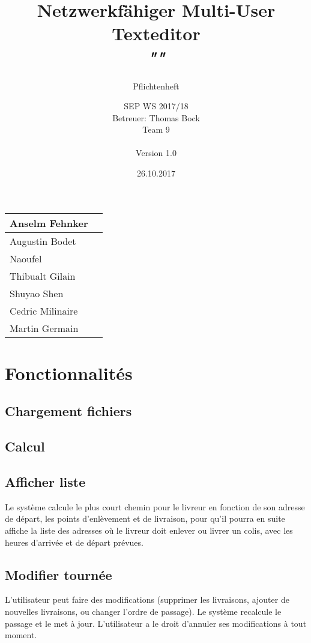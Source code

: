 \documentclass{scrartcl}
\title{Netzwerkfähiger Multi-User Texteditor\\
\textit{"\name"}}
\subtitle{Pflichtenheft}
\author{SEP WS 2017/18\\
Betreuer: Thomas Bock\\
Team 9\\ \\
Version 1.0}
\date{26.10.2017}
\begin{document}
\maketitle

\iffalse
\begin{figure}[h]
	\centering
  \texttt{[image: ../img/insta\_logo]}
	\label{fig:logo}
\end{figure}
\fi
\vfill

\begin{center}
  \begin{tabular}{ | l | r | }
    \hline
    Anselm Fehnker \\ \hline
    Augustin Bodet  \\ \hline
    Naoufel \\ \hline
    Thibualt Gilain \\ \hline
    Shuyao Shen \\ \hline
    Cedric Milinaire\\ \hline
    Martin Germain \\ \hline
  \end{tabular}
\end{center}

\thispagestyle{empty}
\pagebreak
\renewcommand{\contentsname}{Table des matières}
\tableofcontents
\newpage

\section{Fonctionnalités}
\subsection{Chargement fichiers}
\subsection{Calcul}
\subsection{Afficher liste}
Le système calcule le plus court chemin pour le livreur en fonction de son adresse de départ, les points d’enlèvement et de livraison, pour qu'il pourra en suite affiche la liste des adresses où le livreur doit enlever ou livrer un colis, avec les heures d'arrivée et de départ prévues.
\subsection{Modifier tournée}
L'utilisateur peut faire des modifications (supprimer les livraisons, ajouter de nouvelles livraisons, ou changer l'ordre de passage). Le système recalcule le passage et le met à jour. L'utilisateur a le droit d'annuler ses modifications à tout moment.
\end{document}

